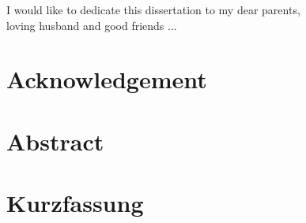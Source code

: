 \documentclass[12pt,twoside]{report}
\renewcommand{\_}{%
  \textunderscore\hspace{0pt}%
}
\begin{document}
\renewcommand{\labelitemii}{$\bullet$}

\clearpage
\pagestyle{empty}
\vspace*{\fill}
\begin{center}
\begin{minipage}{.8\textwidth}
I would like to dedicate this dissertation to my dear parents,\\ loving husband and good friends ...
\end{minipage}
\end{center}
\vfill %
\clearpage
{}
\thispagestyle{empty}
\chapter*{Acknowledgement}

\chapter*{Abstract}

\chapter*{Kurzfassung}

\pagestyle{fancy}
\thispagestyle{empty}
\tableofcontents



\clearpage
\end{document}
